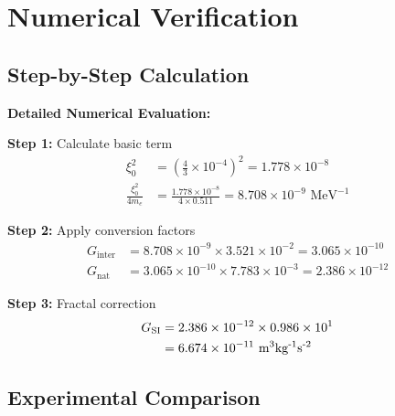 \documentclass[12pt,a4paper]{article}
\begin{document}
	\section{Numerical Verification}
	
	\subsection{Step-by-Step Calculation}
	
	\begin{verification}
		\textbf{Detailed Numerical Evaluation:}
		
		\textbf{Step 1:} Calculate basic term
		\begin{align}
			\xi_0^2 &= \left(\frac{4}{3} \times 10^{-4}\right)^2 = 1.778 \times 10^{-8} \\
			\frac{\xi_0^2}{4 m_e} &= \frac{1.778 \times 10^{-8}}{4 \times 0.511} = 8.708 \times 10^{-9} \text{ MeV}^{-1}
		\end{align}
		
		\textbf{Step 2:} Apply conversion factors
		\begin{align}
			G_{\text{inter}} &= 8.708 \times 10^{-9} \times 3.521 \times 10^{-2} = 3.065 \times 10^{-10} \\
			G_{\text{nat}} &= 3.065 \times 10^{-10} \times 7.783 \times 10^{-3} = 2.386 \times 10^{-12}
		\end{align}
		
		\textbf{Step 3:} Fractal correction
		\begin{align}
			G_{\text{SI}} &= 2.386 \times 10^{-12} \times 0.986 \times 10^{1} \\
			&= 6.674 \times 10^{-11} \text{ m\textsuperscript{3}kg\textsuperscript{-1}s\textsuperscript{-2}}
		\end{align}
	\end{verification}
	
	\subsection{Experimental Comparison}
	
\end{document}
